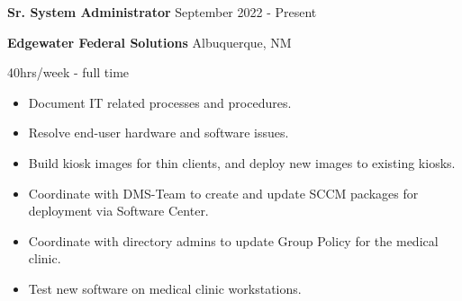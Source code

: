 \documentclass[../main.tex]{subfiles}
\begin{document}
    \textbf{Sr. System Administrator}
    \hfill
    September 2022 - Present
    
    \textbf{Edgewater Federal Solutions}
    \hfill
    Albuquerque, NM
    
    \hfill
    40hrs/week - full time
    \begin{itemize}
        \item Document IT related processes and procedures.
        \item Resolve end-user hardware and software issues.
        \item Build kiosk images for thin clients, and deploy new images to existing kiosks.
        \item Coordinate with DMS-Team to create and update SCCM packages for deployment via Software Center.
        \item Coordinate with directory admins to update Group Policy for the medical clinic.
        \item Test new software on medical clinic workstations.
    \end{itemize}
\end{document}
